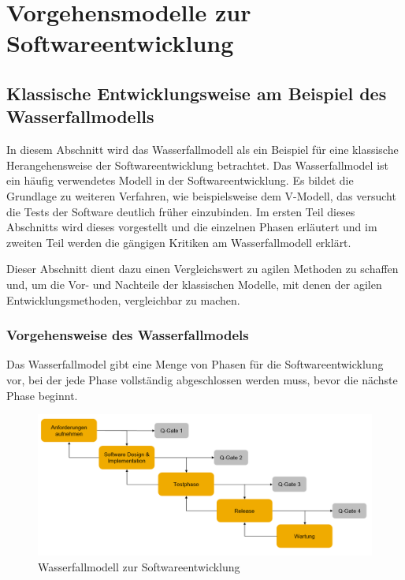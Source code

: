 \chapter{Vorgehensmodelle zur Softwareentwicklung}
\label{cha:vorgehensmodelle}

%
%
    \section{Klassische Entwicklungsweise am Beispiel des Wasserfallmodells}
    \label{sec:wasserfall}

        In diesem Abschnitt wird das Wasserfallmodell als ein Beispiel für eine klassische Herangehensweise der Softwareentwicklung betrachtet. Das Wasserfallmodel ist ein häufig verwendetes Modell in der Softwareentwicklung. Es bildet die Grundlage zu weiteren Verfahren, wie beispielsweise dem V-Modell, das versucht die Tests der Software deutlich früher einzubinden. Im ersten Teil dieses Abschnitts wird dieses vorgestellt und die einzelnen Phasen erläutert und im zweiten Teil werden die gängigen Kritiken am Wasserfallmodell erklärt.

        Dieser Abschnitt dient dazu einen Vergleichswert zu agilen Methoden zu schaffen und, um die Vor- und Nachteile der klassischen Modelle, mit denen der agilen Entwicklungsmethoden, vergleichbar zu machen.

        \subsection{Vorgehensweise des Wasserfallmodels}

        Das Wasserfallmodel gibt eine Menge von Phasen für die Softwareentwicklung vor, bei der jede Phase vollständig abgeschlossen werden muss, bevor die nächste Phase beginnt.

        \begin{figure}[!htbp]
                \begin{center}
                    \includegraphics[width=12cm]{Abbildungen/waterfall}
                    \caption[Wasserfallmodell zur Softwareentwicklung]{Wasserfallmodell zur Softwareentwicklung\protect\footnotemark}
                    \label{abb:waterfall}
                \end{center}
        \end{figure}

